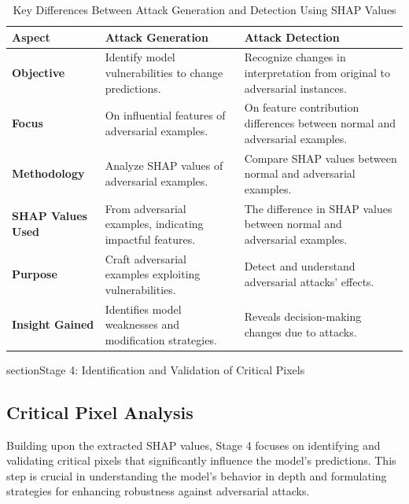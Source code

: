 \documentclass[10pt, conference, a4paper, final]{IEEEtran}
\begin{document}
\begin{table}[h]
    \centering
    \begin{tabular}{|p{1.5cm}|p{2.5cm}|p{2.5cm}|}
    \hline
    \textbf{Aspect} & \textbf{Attack Generation} & \textbf{Attack Detection} \\ \hline
    \textbf{Objective} & Identify model vulnerabilities to change predictions. & Recognize changes in interpretation from original to adversarial instances. \\ \hline
    \textbf{Focus} & On influential features of adversarial examples. & On feature contribution differences between normal and adversarial examples. \\ \hline
    \textbf{Methodology} & Analyze SHAP values of adversarial examples. & Compare SHAP values between normal and adversarial examples. \\ \hline
    \textbf{SHAP Values Used} & From adversarial examples, indicating impactful features. & The difference in SHAP values between normal and adversarial examples. \\ \hline
    \textbf{Purpose} & Craft adversarial examples exploiting vulnerabilities. & Detect and understand adversarial attacks' effects. \\ \hline
    \textbf{Insight Gained} & Identifies model weaknesses and modification strategies. & Reveals decision-making changes due to attacks. \\ \hline
    \end{tabular}
    \caption{Key Differences Between Attack Generation and Detection Using SHAP Values}
    \label{table:attack-gen-det}
    \end{table}
    
    section{Stage 4: Identification and Validation of Critical Pixels}

    \subsection{Critical Pixel Analysis}
    Building upon the extracted SHAP values, Stage 4 focuses on identifying and validating critical pixels that significantly influence the model’s predictions. This step is crucial in understanding the model's behavior in depth and formulating strategies for enhancing robustness against adversarial attacks.
    
\end{document}
